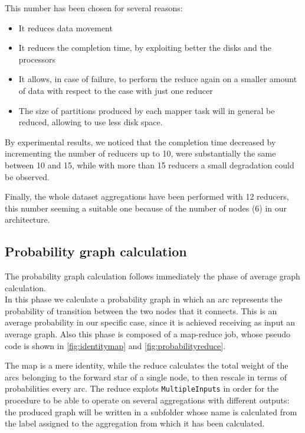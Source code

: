 This number has been chosen for several reasons:
\begin{itemize}
\item It reduces data movement
\item It reduces the completion time, by exploiting better the disks and the processors
\item It allows, in case of failure, to perform the reduce again on a smaller amount of data with respect to the case with just one reducer
\item The size of partitions produced by each mapper task will in general be reduced, allowing to use less disk space.
\end{itemize}

By experimental results, we noticed that the completion time decreased by incrementing the number of reducers up to 10, were substantially the same between 10 and 15, while with more than 15 reducers a small degradation could be observed. 

Finally, the whole dataset aggregations have been performed with 12 reducers, this number seeming a suitable one because of the number of nodes (6) in our architecture. 

\subsection{Probability graph calculation}
The probability graph calculation follows immediately the phase of average graph calculation.\\
In this phase we calculate a probability graph in which an arc represents the probability of transition between the two nodes that it connects. 
This is an average probability in our specific case, since it is achieved receiving as input an average graph.
Also this phase is composed of a map-reduce job, whose pseudo code is shown in \ref{fig:identitymap} and \ref{fig:probabilityreduce}.

The map is a mere identity, while the reduce calculates the total weight of the arcs belonging to the forward star of a single node, to then rescale in terms of probabilities every arc. The reduce explots \texttt{MultipleInputs} in order for the procedure to be able to operate on several aggregations with different outputs: the produced graph will be written in a subfolder whose name is calculated from the
label assigned to the aggregation from which it has been calculated.
  
